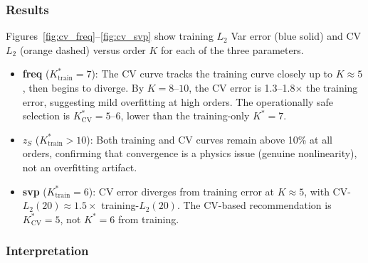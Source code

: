 \documentclass[11pt,a4paper]{article}
\begin{document}
\subsubsection{Results}

Figures~\ref{fig:cv_freq}--\ref{fig:cv_svp} show training $L_2$ Var error (blue solid) and CV
$L_2$ (orange dashed) versus order $K$ for each of the three parameters.

\begin{itemize}
  \item \textbf{freq} ($K^*_\text{train} = 7$): The CV curve tracks the training
        curve closely up to $K \approx 5$, then begins to diverge.  By $K=8$--$10$,
        the CV error is 1.3--1.8$\times$ the training error, suggesting mild
        overfitting at high orders.  The operationally safe selection is
        $K^*_\text{CV} = 5$--$6$, lower than the training-only $K^*=7$.
  \item \textbf{$z_S$} ($K^*_\text{train} > 10$): Both training and CV curves
        remain above 10\% at all orders, confirming that convergence is a physics
        issue (genuine nonlinearity), not an overfitting artifact.
  \item \textbf{svp} ($K^*_\text{train} = 6$): CV error diverges from training
        error at $K \approx 5$, with CV-$L_2(20) \approx 1.5\times$ training-$L_2(20)$.
        The CV-based recommendation is $K^*_\text{CV} = 5$, not $K^*=6$ from training.
\end{itemize}

\subsubsection{Interpretation}
\end{document}
